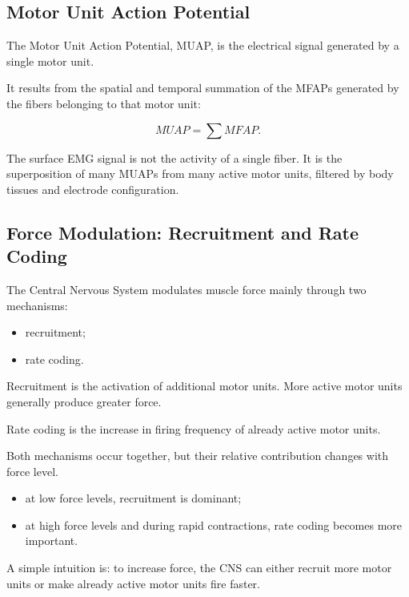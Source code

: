 \subsection{Motor Unit Action Potential}

The Motor Unit Action Potential, MUAP, is the electrical signal generated by a single motor unit.

It results from the spatial and temporal summation of the MFAPs generated by the fibers belonging to that motor unit:

\[
MUAP
=
\sum MFAP.
\]

\begin{authornote}
The surface EMG signal is not the activity of a single fiber. It is the superposition of many MUAPs from many active motor units, filtered by body tissues and electrode configuration.
\end{authornote}

\subsection{Force Modulation: Recruitment and Rate Coding}

The Central Nervous System modulates muscle force mainly through two mechanisms:

\begin{itemize}[noitemsep]
    \item recruitment;
    \item rate coding.
\end{itemize}

Recruitment is the activation of additional motor units. More active motor units generally produce greater force.

Rate coding is the increase in firing frequency of already active motor units.

Both mechanisms occur together, but their relative contribution changes with force level.

\begin{itemize}[noitemsep]
    \item at low force levels, recruitment is dominant;
    \item at high force levels and during rapid contractions, rate coding becomes more important.
\end{itemize}

\begin{authornote}
A simple intuition is: to increase force, the CNS can either recruit more motor units or make already active motor units fire faster.
\end{authornote}

